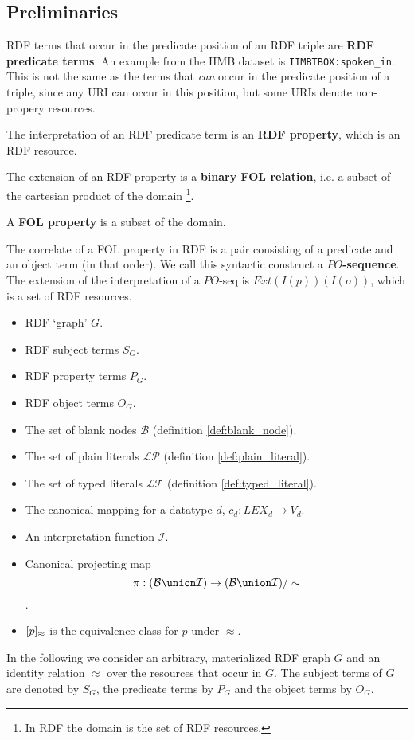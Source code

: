 \subsection{Preliminaries}
\label{sec:preliminaries}

RDF terms that occur in the predicate position of an RDF triple are
  \textbf{RDF predicate terms}.
An example from the IIMB dataset is \verb|IIMBTBOX:spoken_in|.
This is not the same as the terms that \emph{can} occur
  in the predicate position of a triple,
  since any URI can occur in this position,
  but some URIs denote non-propery resources.

The interpretation of an RDF predicate term is an \textbf{RDF property},
  which is an RDF resource.

The extension of an RDF property is a \textbf{binary FOL relation},
  i.e. a subset of the cartesian product of the domain
  \footnote{In RDF the domain is the set of RDF resources.}.

A \textbf{FOL property} is a subset of the domain.

The correlate of a FOL property in RDF is a pair
  consisting of a predicate and an object term (in that order).
We call this syntactic construct a \textbf{$PO$-sequence}.
The extension of the interpretation of a $PO$-seq is
  $Ext(I(p))(I(o))$, which is a set of RDF resources.

\begin{itemize}
\item RDF `graph' $G$.
\item RDF subject terms $S_G$.
\item RDF property terms $P_G$.
\item RDF object terms $O_G$.
\item The set of blank nodes $\mathcal{B}$ (definition \ref{def:blank_node}).
\item The set of plain literals $\mathcal{LP}$ (definition \ref{def:plain_literal}).
\item The set of typed literals $\mathcal{LT}$ (definition \ref{def:typed_literal}).
\item The canonical mapping for a datatype $d$, $c_d : LEX_d \rightarrow V_d$.
\item An interpretation function $\mathcal{I}$.
\item Canonical projecting map
  \[
    \pi : (\mathcal{B} \union \mathcal{I})
  \rightarrow
    (\mathcal{B} \union \mathcal{I})/\sim
  \].
\item $[p]_{\approx}$ is the equivalence class for $p$ under $\approx$.
\end{itemize}

In the following we consider an arbitrary,
  materialized RDF graph $G$ and an identity relation $\approx$ over
  the resources that occur in $G$.
The subject terms of $G$ are denoted by $S_G$, the predicate terms by $P_G$
  and the object terms by $O_G$.

